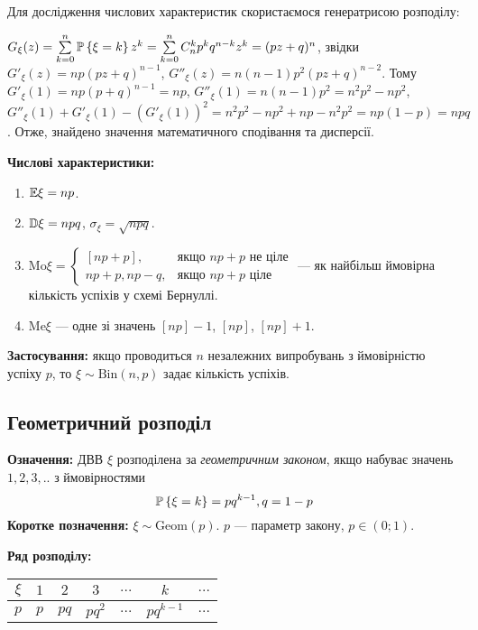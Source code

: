 Для дослідження числових характеристик скористаємося генератрисою розподілу:

$G_\xi(z) = \sum\limits_{k=0}^{n} \P\left\{\xi = k\right\} z^k = \sum\limits_{k=0}^{n} C_n^k p^k q^{n-k} z^k = (pz+q)^n$,
звідки 
$G'_\xi(z) = np(pz+q)^{n-1}$, $G''_\xi(z) = n(n-1)p^2(pz+q)^{n-2}$.
Тому 
$G'_\xi(1) = np(p+q)^{n-1} = np$, $G''_\xi(1) = n(n-1)p^2 = n^2p^2 - np^2$, $G''_\xi(1) + G'_\xi(1) - \left( G'_\xi(1)\right)^2 = n^2p^2 - np^2 + np - n^2p^2 = np(1-p) = npq$.
Отже, знайдено значення математичного сподівання та дисперсії.

\begin{samepage}
\noindent\textbf{Числові характеристики:}
\begin{enumerate}
    \item $\E\xi = np$.
    \item $\D\xi = npq$, $\sigma_\xi = \sqrt{npq}$.
    \item $\mathrm{Mo}\xi = \begin{cases}
        \left[np+p\right], & \text{якщо } np+p \text{ не ціле}\\
        np+p, np-q, & \text{якщо } np+p \text{ ціле}
    \end{cases}$ --- як найбільш ймовірна кількість успіхів у схемі Бернуллі.
    \item $\mathrm{Me}\xi$ --- одне зі значень $\left[np\right] - 1$, $\left[np\right]$, $\left[np\right] + 1$.
\end{enumerate}
\end{samepage}

\noindent\textbf{Застосування:} якщо проводиться $n$ незалежних випробувань з ймовірністю успіху $p$, 
то $\xi \sim \mathrm{Bin}(n, p)$ задає кількість успіхів.

\subsection{Геометричний розподіл}
\noindent\textbf{Означення:}
    ДВВ $\xi$ розподілена за \emph{геометричним законом}, 
    якщо набуває значень $1,2,3,..$ з ймовірностями \begin{equation}
        \P\left\{\xi = k\right\} = pq^{k-1}, q = 1 - p
    \end{equation}
    \textbf{Коротке позначення:} $\xi \sim \mathrm{Geom}(p)$.
    $p$ --- параметр закону, $p\in (0;1)$.    

\noindent\textbf{Ряд розподілу:}
\begin{center}
    \begin{tabular}{|c|c|c|c|c|c|c|}
        \hline
        $\xi$ & $1$ & $2$ & $3$ & $...$ & $k$ & $...$ \\
        \hline
        $p$ & $p$ & $pq$ & $pq^2$ & $...$ & $pq^{k-1}$ & $...$ \\
        \hline
    \end{tabular}
\end{center}

